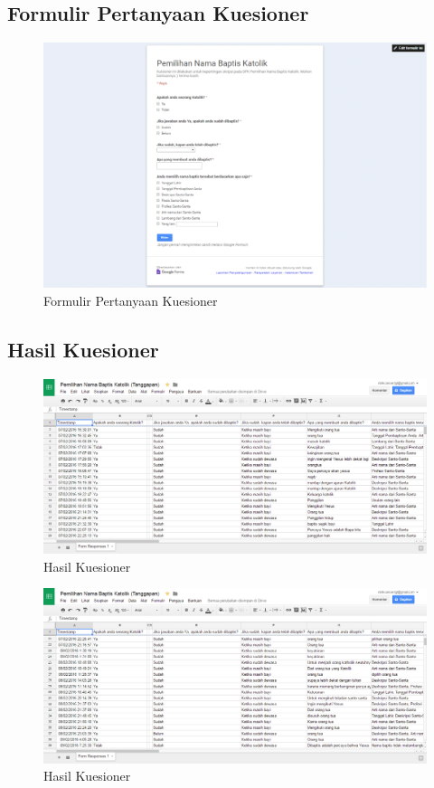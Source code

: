 \subsection{Formulir Pertanyaan Kuesioner}
\label{sec:kuesioner}

\begin{figure}[htbp]
		\centering
			\includegraphics[scale=0.35]{Gambar/formkuesioner.PNG}
			\caption{Formulir Pertanyaan Kuesioner}
		\label{fig:form}
	\end{figure}

\subsection{Hasil Kuesioner}
\label{sec:kuesioner}


\begin{figure}[htbp]
		\centering
			\includegraphics[scale=0.38]{Gambar/kuesioner1.PNG}
			\caption{Hasil Kuesioner}
		\label{fig:kues1}
	\end{figure}
	
	\begin{figure}[htbp]
		\centering
			\includegraphics[scale=0.38]{Gambar/kuesioner2.PNG}
			\caption{Hasil Kuesioner}
		\label{fig:kues2}
	\end{figure}
	
